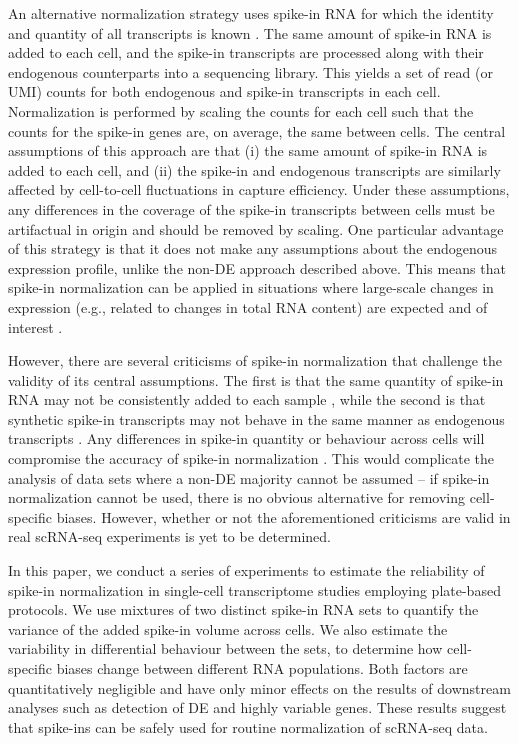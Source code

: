 \documentclass{article}
\begin{document}
An alternative normalization strategy uses spike-in RNA for which the identity and quantity of all transcripts is known \cite{stegle2015computational}.
The same amount of spike-in RNA is added to each cell, and the spike-in transcripts are processed along with their endogenous counterparts into a sequencing library.
This yields a set of read (or UMI) counts for both endogenous and spike-in transcripts in each cell.
Normalization is performed by scaling the counts for each cell such that the counts for the spike-in genes are, on average, the same between cells.
The central assumptions of this approach are that (i) the same amount of spike-in RNA is added to each cell, and (ii) the spike-in and endogenous transcripts are similarly affected by cell-to-cell fluctuations in capture efficiency.
Under these assumptions, any differences in the coverage of the spike-in transcripts between cells must be artifactual in origin and should be removed by scaling.
One particular advantage of this strategy is that it does not make any assumptions about the endogenous expression profile, unlike the non-DE approach described above.
This means that spike-in normalization can be applied in situations where large-scale changes in expression (e.g., related to changes in total RNA content) are expected and of interest \cite{lun2016stepbystep}.

However, there are several criticisms of spike-in normalization that challenge the validity of its central assumptions.
The first is that the same quantity of spike-in RNA may not be consistently added to each sample \cite{robinson2010tmm}, while the second is that synthetic spike-in transcripts may not behave in the same manner as endogenous transcripts \cite{grun2015design}.
Any differences in spike-in quantity or behaviour across cells will compromise the accuracy of spike-in normalization \cite{risso2014normalization}.
This would complicate the analysis of data sets where a non-DE majority cannot be assumed -- if spike-in normalization cannot be used, there is no obvious alternative for removing cell-specific biases.
However, whether or not the aforementioned criticisms are valid in real scRNA-seq experiments is yet to be determined.

In this paper, we conduct a series of experiments to estimate the reliability of spike-in normalization in single-cell transcriptome studies employing plate-based protocols.
We use mixtures of two distinct spike-in RNA sets to quantify the variance of the added spike-in volume across cells.
We also estimate the variability in differential behaviour between the sets, to determine how cell-specific biases change between different RNA populations.
Both factors are quantitatively negligible and have only minor effects on the results of downstream analyses such as detection of DE and highly variable genes.
These results suggest that spike-ins can be safely used for routine normalization of scRNA-seq data.
\end{document}
